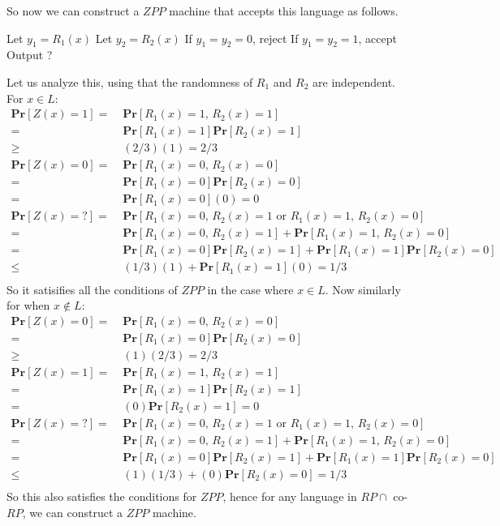 \documentclass[english]{article}
\begin{document}
So now we can construct a $ZPP$ machine that accepts this language as follows. 
\begin{algorithmic}
  \State Let $y_1 = R_1(x)$
  \State Let $y_2 = R_2(x)$
  \State If $y_1 = y_2 = 0$, reject
  \State If $y_1 = y_2 = 1$, accept
  \State Output ?
\EndFunction 
\end{algorithmic}

Let us analyze this, using that the randomness of $R_1$ and $R_2$ are independent. For $x \in L$:
\begin{align*}
\mathbf{Pr}[Z(x) = 1]
  =&\; \mathbf{Pr}[R_1(x) = 1,\, R_2(x) = 1] \\
  =&\; \mathbf{Pr}[R_1(x) = 1] \mathbf{Pr}[R_2(x) = 1] \\
  \ge&\; (2/3)(1) = 2/3 \\
\mathbf{Pr}[Z(x) = 0]
  =&\; \mathbf{Pr}[R_1(x) = 0,\, R_2(x) = 0] \\
  =&\; \mathbf{Pr}[R_1(x) = 0] \mathbf{Pr}[R_2(x) = 0] \\
  =&\; \mathbf{Pr}[R_1(x) = 0](0) = 0 \\
\mathbf{Pr}[Z(x) = ?]
  =&\; \mathbf{Pr}[R_1(x) = 0,\, R_2(x) = 1 \textrm{ or } R_1(x) = 1,\, R_2(x) = 0] \\
  =&\; \mathbf{Pr}[R_1(x) = 0,\, R_2(x) = 1] + \mathbf{Pr}[R_1(x) = 1,\, R_2(x) = 0] \\
  =&\; \mathbf{Pr}[R_1(x) = 0]\mathbf{Pr}[R_2(x) = 1] + \mathbf{Pr}[R_1(x) = 1]\mathbf{Pr}[R_2(x) = 0] \\
  \le&\; (1/3)(1) + \mathbf{Pr}[R_1(x) = 1](0) = 1/3 \\
\end{align*}
So it satisifies all the conditions of $ZPP$ in the case where $x \in L$. Now similarly for when $x \notin L$:
\begin{align*}
\mathbf{Pr}[Z(x) = 0]
  =&\; \mathbf{Pr}[R_1(x) = 0,\, R_2(x) = 0] \\
  =&\; \mathbf{Pr}[R_1(x) = 0] \mathbf{Pr}[R_2(x) = 0] \\
  \ge&\; (1)(2/3) = 2/3 \\
\mathbf{Pr}[Z(x) = 1]
  =&\; \mathbf{Pr}[R_1(x) = 1,\, R_2(x) = 1] \\
  =&\; \mathbf{Pr}[R_1(x) = 1] \mathbf{Pr}[R_2(x) = 1] \\
  =&\; (0)\mathbf{Pr}[R_2(x) = 1] = 0 \\
\mathbf{Pr}[Z(x) = ?]
  =&\; \mathbf{Pr}[R_1(x) = 0,\, R_2(x) = 1 \textrm{ or } R_1(x) = 1,\, R_2(x) = 0] \\
  =&\; \mathbf{Pr}[R_1(x) = 0,\, R_2(x) = 1] + \mathbf{Pr}[R_1(x) = 1,\, R_2(x) = 0] \\
  =&\; \mathbf{Pr}[R_1(x) = 0]\mathbf{Pr}[R_2(x) = 1] + \mathbf{Pr}[R_1(x) = 1]\mathbf{Pr}[R_2(x) = 0] \\
  \le&\; (1)(1/3) + (0)\mathbf{Pr}[R_2(x) = 0] = 1/3 \\
\end{align*}
So this also satisfies the conditions for $ZPP$, hence for any language in $RP \cap$ co-$RP$, we can construct a
$ZPP$ machine. 
\end{document}
